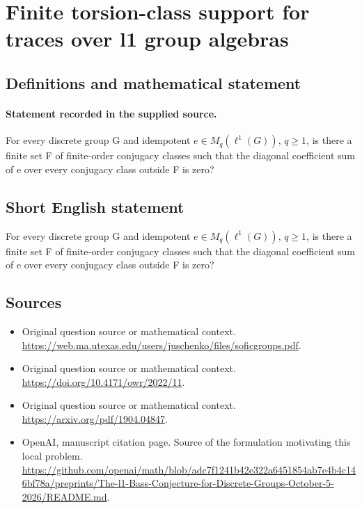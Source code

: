 \documentclass[11pt]{article}
\begin{document}
\section*{Finite torsion-class support for traces over l1 group algebras}\label{statement}
\subsection{Definitions and mathematical statement}
\paragraph{Statement recorded in the supplied source.}
For every discrete group G and idempotent $e\in M_q(\ell ^{1}(G))$, $q\geq 1$, is there a finite set F of finite-order conjugacy classes such that the diagonal coefficient sum of e over every conjugacy class outside F is zero?
\subsection{Short English statement}
For every discrete group G and idempotent $e\in M_q(\ell ^{1}(G))$, $q\geq 1$, is there a finite set F of finite-order conjugacy classes such that the diagonal coefficient sum of e over every conjugacy class outside F is zero?
\subsection{Sources}
\begin{itemize}
\item[S1] Original question source or mathematical context.
\url{https://web.ma.utexas.edu/users/juschenko/files/soficgroups.pdf}.
\item[S2] Original question source or mathematical context.
\url{https://doi.org/10.4171/owr/2022/11}.
\item[S3] Original question source or mathematical context.
\url{https://arxiv.org/pdf/1904.04847}.
\item[S4] OpenAI, manuscript citation page. Source of the formulation motivating this local problem.
\url{https://github.com/openai/math/blob/adc7f1241b42e322a6451854ab7e4b4c146bf78a/preprints/The-l1-Bass-Conjecture-for-Discrete-Groups-October-5-2026/README.md}.
\end{itemize}
\end{document}
